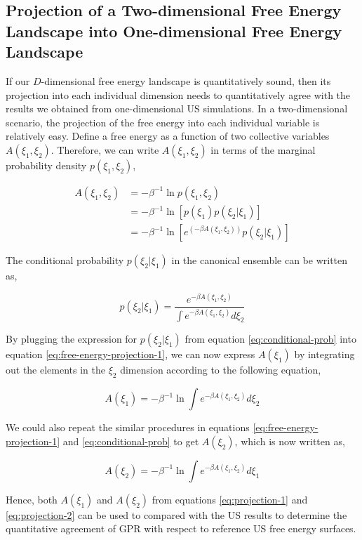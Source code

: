 \begin{spacing}{2.0}
    \subsection{Projection of a Two-dimensional Free Energy Landscape into One-di\-men\-sional Free Energy Landscape}

    If our $D$-dimensional free energy landscape is quantitatively sound, then its projection into each individual dimension needs to quantitatively 
    agree with the results we obtained from one-dimensional US simulations. In a two-dimensional scenario, the projection of the free energy into
    each individual variable is relatively easy. Define a free energy as a function of two collective variables $A(\xi_1,\xi_2)$. Therefore,
    we can write $A(\xi_1,\xi_2)$ in terms of the marginal probability density $p(\xi_1,\xi_2)$,

    \begin{equation}\begin{aligned}
        A(\xi_1,\xi_2) &= -\beta^{-1}\ln p(\xi_1,\xi_2) \\
                       &= -\beta^{-1}\ln\left[p(\xi_1)p(\xi_2|\xi_1)\right] \\
                       &= -\beta^{-1}\ln\left[e^{\left(-\beta A(\xi_1,\xi_2)\right)}p(\xi_2|\xi_1)\right]
        \label{eq:free-energy-projection-1}
    \end{aligned}\end{equation}

    The conditional probability $p(\xi_2|\xi_1)$ in the canonical ensemble can be written as,

    \begin{equation}
        p(\xi_2|\xi_1) = \frac{e^{-\beta A(\xi_1,\xi_2)}}{\int e^{-\beta A(\xi_1,\xi_2)} d\xi_2}
        \label{eq:conditional-prob}
    \end{equation}

    By plugging the expression for $p(\xi_2|\xi_1)$ from equation \ref{eq:conditional-prob} into equation \ref{eq:free-energy-projection-1},
    we can now express $A(\xi_1)$ by integrating out the elements in the $\xi_2$ dimension according to the following equation,

    \begin{equation}
        A(\xi_1) = -\beta^{-1}\ln\int e^{-\beta A(\xi_1,\xi_2)} d\xi_2
        \label{eq:projection-1}
    \end{equation}

    We could also repeat the similar procedures in equations \ref{eq:free-energy-projection-1} and \ref{eq:conditional-prob} to get $A(\xi_2)$,
    which is now written as,

    \begin{equation}
        A(\xi_2) = -\beta^{-1}\ln\int e^{-\beta A(\xi_1,\xi_2)} d\xi_1
        \label{eq:projection-2}
    \end{equation}

    Hence, both $A(\xi_1)$ and $A(\xi_2)$ from equations \ref{eq:projection-1} and \ref{eq:projection-2} can be used to compared with the US results
    to determine the quantitative agreement of GPR with respect to reference US free energy surfaces.
\end{spacing}

